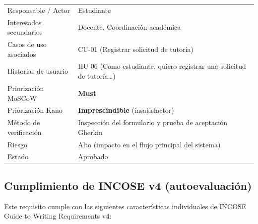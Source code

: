 \documentclass[11pt,a4paper]{article}
\begin{document}
\begin{table}[htbp]
\begin{tabularx}{\textwidth}{L{3.7cm}X}
Responsable / Actor          & Estudiante\\
Interesados secundarios      & Docente, Coordinaci\'on acad\'emica\\
Casos de uso asociados       & CU-01 (Registrar solicitud de tutor\'ia)\\
Historias de usuario         & HU-06 (Como estudiante, quiero registrar una solicitud
                               de tutor\'ia\ldots)\\
Priorizaci\'on MoSCoW        & \textbf{Must}\\
Priorizaci\'on Kano          & \textbf{Imprescindible} (insatisfactor)\\
M\'etodo de verificaci\'on   & Inspecci\'on del formulario y prueba de aceptaci\'on Gherkin\\
Riesgo                       & Alto (impacto en el flujo principal del sistema)\\
Estado                       & Aprobado\\
\bottomrule
\end{tabularx}
\end{table}

\subsection*{Cumplimiento de INCOSE v4 (autoevaluaci\'on)}

Este requisito cumple con las siguientes caracter\'isticas individuales de INCOSE
Guide to Writing Requirements v4:
\end{document}
